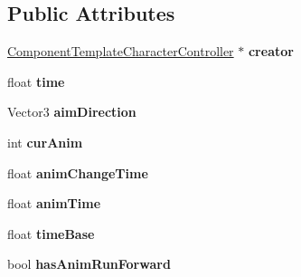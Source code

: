 \subsection*{\-Public \-Attributes}
\begin{DoxyCompactItemize}
\item 
\hypertarget{classComponentCharacterController_ac99ef9c9921b3a30e1b5ec98f95b1cdd}{
\hyperlink{classComponentTemplateCharacterController}{\-Component\-Template\-Character\-Controller} $\ast$ {\bfseries creator}}
\label{dd/d8a/classComponentCharacterController_ac99ef9c9921b3a30e1b5ec98f95b1cdd}

\item 
\hypertarget{classComponentCharacterController_a5e9a0e09d185602e3805cc8dcbac7b66}{
float {\bfseries time}}
\label{dd/d8a/classComponentCharacterController_a5e9a0e09d185602e3805cc8dcbac7b66}

\item 
\hypertarget{classComponentCharacterController_a1de5468dfead9c5ead1f401b3c2a750d}{
\-Vector3 {\bfseries aim\-Direction}}
\label{dd/d8a/classComponentCharacterController_a1de5468dfead9c5ead1f401b3c2a750d}

\item 
\hypertarget{classComponentCharacterController_af918e23c41b655f0426985b097f3313c}{
int {\bfseries cur\-Anim}}
\label{dd/d8a/classComponentCharacterController_af918e23c41b655f0426985b097f3313c}

\item 
\hypertarget{classComponentCharacterController_a6493c29f4342eb448f8c96f82ff81e48}{
float {\bfseries anim\-Change\-Time}}
\label{dd/d8a/classComponentCharacterController_a6493c29f4342eb448f8c96f82ff81e48}

\item 
\hypertarget{classComponentCharacterController_a382c67c3653e7a3c7d46bba6623ccb81}{
float {\bfseries anim\-Time}}
\label{dd/d8a/classComponentCharacterController_a382c67c3653e7a3c7d46bba6623ccb81}

\item 
\hypertarget{classComponentCharacterController_ad7a8858d74c7357901f60f78e43b805d}{
float {\bfseries time\-Base}}
\label{dd/d8a/classComponentCharacterController_ad7a8858d74c7357901f60f78e43b805d}

\item 
\hypertarget{classComponentCharacterController_a91538cd14434f5df384b1d1844b71165}{
bool {\bfseries has\-Anim\-Run\-Forward}}
\label{dd/d8a/classComponentCharacterController_a91538cd14434f5df384b1d1844b71165}


\end{DoxyCompactItemize}
